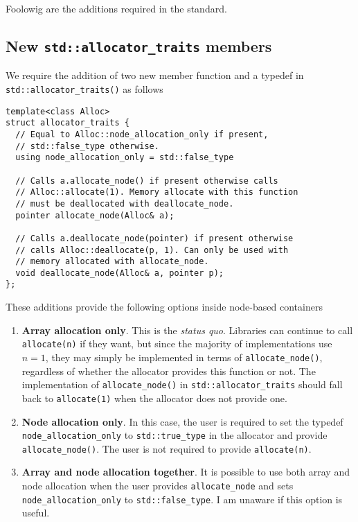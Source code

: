 \documentclass[11pt]{article}
\begin{document}
Foolowig are the additions required in the standard.

\subsection{New \texttt{std::allocator\_traits} members}

We require the addition of two new member function and
a typedef in \texttt{std::allocator\_traits()} as follows

\medskip
\begin{lstlisting}
template<class Alloc>
struct allocator_traits {
  // Equal to Alloc::node_allocation_only if present,
  // std::false_type otherwise.
  using node_allocation_only = std::false_type

  // Calls a.allocate_node() if present otherwise calls
  // Alloc::allocate(1). Memory allocate with this function
  // must be deallocated with deallocate_node.
  pointer allocate_node(Alloc& a);

  // Calls a.deallocate_node(pointer) if present otherwise
  // calls Alloc::deallocate(p, 1). Can only be used with
  // memory allocated with allocate_node.
  void deallocate_node(Alloc& a, pointer p);
};
\end{lstlisting}
These additions provide the following options inside node-based
containers
\begin{enumerate}
\item {\bf Array allocation only}.
This is the {\it status quo}. Libraries can continue to call
\texttt{allocate(n)} if they want, but since the majority of implementations
use $n = 1$, they may simply be implemented in terms of
\texttt{allocate\_node()}, regardless of whether the allocator provides this
function or not. The implementation of \texttt{allocate\_node()} in
\texttt{std::allocator\_traits} should fall back to \texttt{allocate(1)} 
when the allocator does not provide one.

\item {\bf Node allocation only}.
In this case, the user is required to set the typedef \texttt{node\_allocation\_only}
to \texttt{std::true\_type} in the allocator and provide \texttt{allocate\_node()}. The user is
not required to provide \texttt{allocate(n)}.
\item {\bf Array and node allocation together}. It is possible to use
both array {and} node allocation when the user provides \texttt{allocate\_node}
and sets \texttt{node\_allocation\_only} to \texttt{std::false\_type}.
I am unaware if this option is useful.
\end{enumerate}
\end{document}
